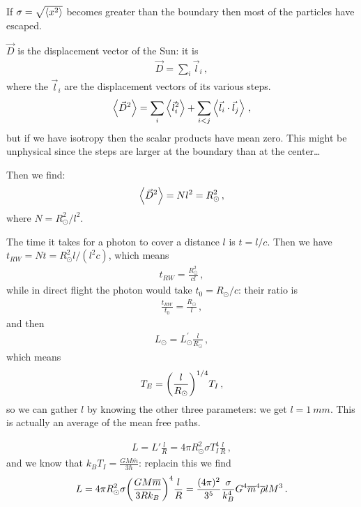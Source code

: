 \documentclass[main.tex]{subfiles}
\begin{document}
If \(\sigma = \sqrt{\expval{x^2}}\) becomes greater than the boundary then most of the particles have escaped. 

\(\vec{D}\) is the displacement vector of the Sun: it is 
%
\begin{align}
  \vec{D} = \sum _{i} \vec{l}_{i}
\,,
\end{align}
%
where the \(\vec{l}_i\) are the displacement vectors of its various steps. 
%
\begin{align}
  \expval{\vec{D}^2} = \sum _{i} \expval{\vec{l}_{i}^2} 
  + \sum _{i<j} \expval{\vec{l}_i \cdot \vec{l}_j}
\,,
\end{align}
%
but if we have isotropy then the scalar products have mean zero. This might be unphysical since the steps are larger at the boundary than at the center\dots

Then we find: 
%
\begin{align}
  \expval{\vec{D}^2} = N l^2 = R _{\odot}^2
\,,
\end{align}
%
where \(N = R _{\odot}^2 / l^2\). 

The time it takes for a photon to cover a distance \(l\) is \(t= l/c\). 
Then we have \(t_{RW} = Nt = R^2 _{\odot} l / (l^2 c)\), which means 
%
\begin{align}
  t_{RW} = \frac{R _{\odot}^2}{cl}
\,,
\end{align}
%
while in direct flight the photon would take \(t_0 = R _{\odot}/ c\): their ratio is 
%
\begin{align}
  \frac{t_{RW}}{t_0 } = \frac{R _{\odot}}{l}
\,,
\end{align}
%
and then 
%
\begin{align}
  L _{\odot} = L _{\odot}^{\prime } \frac{l}{R _{\odot}}
\,,
\end{align}
%
which means 
%
\begin{align}
  T_E = \qty(\frac{l}{R _{\odot}})^{1/4} T_I
\,,
\end{align}
%
so we can gather \(l\) by knowing the other three parameters: we get \(l = \SI{1}{mm}\). This is actually an average of the mean free paths. 

\begin{align}
  L = L' \frac{l}{R} = 4 \pi R _{\odot}^2 \sigma T_I^{4} \frac{l}{R}
\,,
\end{align}
%
and we know that \(k_B T_I = \frac{GM \overline{m}}{3 \hbar}\): replacin this we find 
%
\begin{align}
  L = 4 \pi R^2 _{\odot}\sigma  \qty(\frac{GM \overline{m}}{3 R k_B})^{4} \frac{l}{R}
  = \frac{(4 \pi )^2}{3^{5}} \frac{\sigma }{k_B^4} G^{4} \overline{m}^{4} \overline{\rho} l M^3  
\,.
\end{align}
\end{document}

